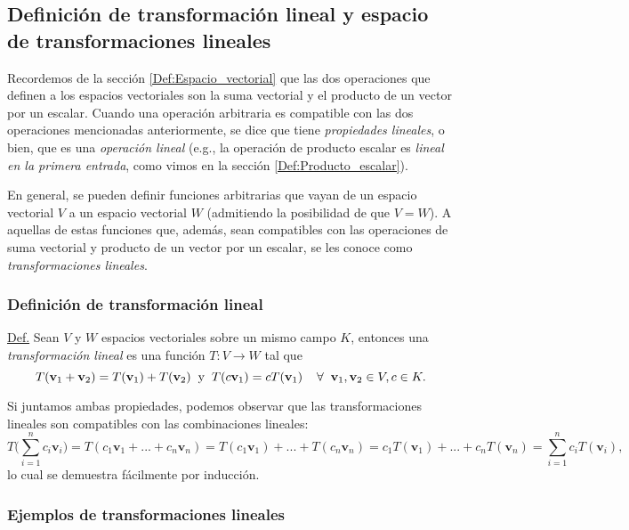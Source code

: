 \documentclass[12pt]{article}
\begin{document}
\subsection{Definición de transformación lineal y espacio de transformaciones lineales}

Recordemos de la sección \ref{Def:Espacio_vectorial} que las dos operaciones que definen a los espacios vectoriales son la suma vectorial y el producto de un vector por un escalar. Cuando una operación arbitraria es compatible con las dos operaciones mencionadas anteriormente, se dice que tiene \emph{propiedades lineales}, o bien, que es una \emph{operación lineal} (e.g., la operación de producto escalar es \emph{lineal en la primera entrada}, como vimos en la sección \ref{Def:Producto_escalar}). 

En general, se pueden definir funciones arbitrarias que vayan de un espacio vectorial $V$ a un espacio vectorial $W$ (admitiendo la posibilidad de que $V=W$). A aquellas de estas funciones que, además, sean compatibles con las operaciones de suma vectorial y producto de un vector por un escalar, se les conoce como \emph{transformaciones lineales}.

\subsubsection{Definición de transformación lineal}
\begin{tcolorbox} \label{Def:Transformación_lineal} 
    \underline{Def.} Sean $V$ y $W$ espacios vectoriales sobre un mismo campo $K$, entonces una \emph{transformación lineal} es una función $T:V\to W$ tal que $$T(\mathbf{v}_1+\mathbf{v}_2)=T(\mathbf{v}_1)+T(\mathbf{v}_2) \hspace{2mm}\text{y}\hspace{2mm} T(c\mathbf{v}_1)=cT(\mathbf{v}_1)\hspace{4mm}\forall\hspace{2mm} \mathbf{v}_1, \mathbf{v}_2\in V, c\in K.$$

    Si juntamos ambas propiedades, podemos observar que las transformaciones lineales son compatibles con las combinaciones lineales: $$T\big ( \sum_{i=1}^n c_i\mathbf{v}_i \big ) = T(c_1\mathbf{v}_1+...+c_n\mathbf{v}_n)=T(c_1\mathbf{v}_1)+...+T(c_n\mathbf{v}_n)=c_1 T(\mathbf{v}_1)+...+c_n T(\mathbf{v}_n)=\sum_{i=1}^n c_i T(\mathbf{v}_i),$$ lo cual se demuestra fácilmente por inducción.  
\end{tcolorbox}

\subsubsection{Ejemplos de transformaciones lineales} \label{Ejem:Transformaciones_lineales}
\end{document}
